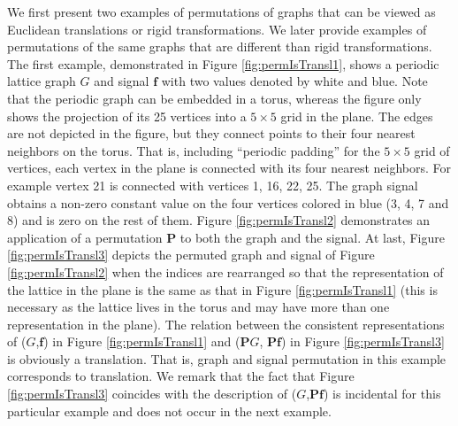 \documentclass{article}
\def\BP{\boldsymbol{P}}
\def\Bf{\boldsymbol{f}}
\begin{document}
 {We first present two examples of permutations of graphs that can be viewed as Euclidean translations or rigid transformations. We later provide examples of permutations of the same graphs that are different than rigid transformations. The first example, demonstrated in Figure \ref{fig:permIsTransl1}, shows a periodic lattice graph $G$ and signal $\Bf$ with two values denoted by white and blue.} Note that the periodic graph can be embedded in a torus, whereas the figure only shows the projection of its 25 vertices into a $5 \times 5$ grid in the plane. The edges are not depicted in the figure, but they connect points to their four nearest neighbors on the torus. That is, including ``periodic padding'' for the $5 \times 5$ grid of vertices, each vertex in the plane is connected with its four nearest neighbors. For example vertex 21 is connected with vertices 1, 16, 22, 25. The graph signal obtains a non-zero constant value on the four vertices colored in blue (3, 4, 7 and 8) and is zero on the rest of them. Figure \ref{fig:permIsTransl2} demonstrates an application of a permutation $\BP$ to both the graph and the signal. At last, Figure \ref{fig:permIsTransl3} depicts the permuted graph and signal of Figure \ref{fig:permIsTransl2} when the indices are rearranged so that the representation of the lattice in the plane is the same as that in Figure \ref{fig:permIsTransl1} (this is necessary as the lattice lives in the torus and may have more than one representation in the plane). The relation between the consistent representations of ($G$,$\Bf$) in Figure \ref{fig:permIsTransl1} and ($\BP G$, $\BP \Bf$) in Figure \ref{fig:permIsTransl3} is obviously a translation. That is, graph and signal permutation in this example corresponds to translation. We remark that the fact that Figure \ref{fig:permIsTransl3} coincides with the description of ($G$,$\BP \Bf$) is incidental for this particular example and does not occur in the next example.
\end{document}
